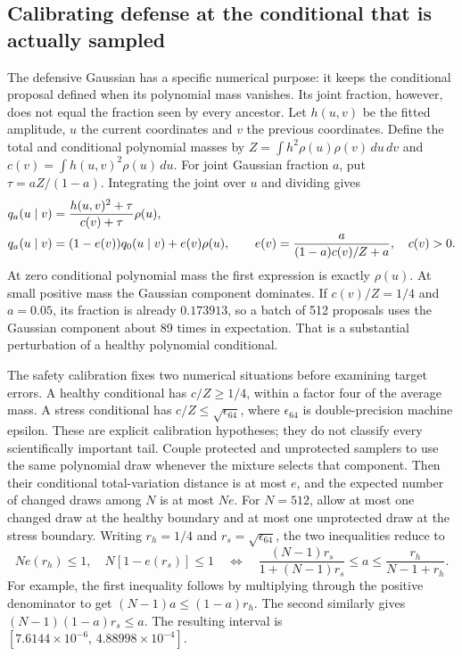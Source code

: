 \documentclass[11pt]{article}
\begin{document}
\subsection{Calibrating defense at the conditional that is actually sampled}

The defensive Gaussian has a specific numerical purpose: it keeps the
conditional proposal defined when its polynomial mass vanishes. Its joint
fraction, however, does not equal the fraction seen by every ancestor. Let
$h(u,v)$ be the fitted amplitude, $u$ the current coordinates and $v$ the
previous coordinates. Define the total and conditional polynomial masses by
$Z=\int h^2\rho(u)\rho(v)\,du\,dv$ and
$c(v)=\int h(u,v)^2\rho(u)\,du$. For joint Gaussian fraction $a$, put
$\tau=aZ/(1-a)$. Integrating the joint over $u$ and dividing gives
\begin{align}
 q_a(u\mid v)&=\frac{h(u,v)^2+\tau}{c(v)+\tau}\rho(u),\notag\\
 q_a(u\mid v)&=(1-e(v))q_0(u\mid v)+e(v)\rho(u),\qquad
 e(v)=\frac{a}{(1-a)c(v)/Z+a},\quad c(v)>0.
 \label{eq:sgqf-defense-conditional}
\end{align}
At zero conditional polynomial mass the first expression is exactly
$\rho(u)$. At small positive mass the Gaussian component dominates. If
$c(v)/Z=1/4$ and $a=0.05$, its fraction is already $0.173913$, so a batch of
512 proposals uses the Gaussian component about 89 times in expectation.
That is a substantial perturbation of a healthy polynomial conditional.

The safety calibration fixes two numerical situations before examining target
errors. A healthy conditional has $c/Z\geq1/4$, within a factor four of the
average mass. A stress conditional has $c/Z\leq\sqrt{\epsilon_{64}}$, where
$\epsilon_{64}$ is double-precision machine epsilon. These are explicit
calibration hypotheses; they do not classify every scientifically important
tail. Couple protected and unprotected samplers to use the same polynomial
draw whenever the mixture selects that component. Then their conditional
total-variation distance is at most $e$, and the expected number of changed
draws among $N$ is at most $Ne$. For $N=512$, allow at most one changed draw
at the healthy boundary and at most one unprotected draw at the stress
boundary. Writing $r_h=1/4$ and $r_s=\sqrt{\epsilon_{64}}$, the two
inequalities reduce to
\begin{equation}
 Ne(r_h)\leq1,\quad N[1-e(r_s)]\leq1
 \quad\Longleftrightarrow\quad
 \frac{(N-1)r_s}{1+(N-1)r_s}\leq a\leq
 \frac{r_h}{N-1+r_h}.
 \label{eq:sgqf-defense-calibration}
\end{equation}
For example, the first inequality follows by multiplying through the positive
denominator to get $(N-1)a\leq(1-a)r_h$. The second similarly gives
$(N-1)(1-a)r_s\leq a$. The resulting interval is
$[7.6144\times10^{-6},\,4.88998\times10^{-4}]$.
\end{document}
